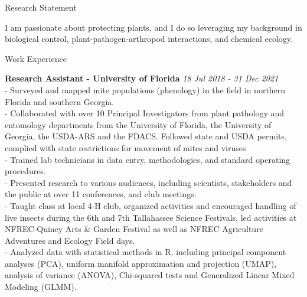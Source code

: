 \documentclass{resume} %
\begin{document}
\begin{rSection}{Research Statement}
	
I am passionate about protecting plants, and I do so leveraging my background in biological control, plant-pathogen-arthropod interactions, and chemical ecology. \end{rSection}

\begin{rSection}{Work Experience}
	
	\textbf{Research Assistant - University of Florida} \hfill {\em \textit{18 Jul 2018 - 31 Dec 2021}}\\
- Surveyed and mapped mite populations (phenology) in the field in northern Florida and southern Georgia.\\
- Collaborated with over 10 Principal Investigators from plant pathology and entomology departments from the University of Florida, the University of Georgia, the USDA-ARS and the FDACS. Followed state and USDA permits, complied with state restrictions for movement of mites and viruses\\
 - Trained lab technicians in data entry, methodologies, and standard operating procedures.\\
 - Presented research to various audiences, including scientists, stakeholders and the public at over 11 conferences, and club meetings.\\
 - Taught class at local 4-H club, organized activities and encouraged handling of live insects during the 6th and 7th Tallahassee Science Festivals, led activities at NFREC-Quincy Arts \& Garden Festival as well as NFREC Agriculture Adventures and Ecology Field days.\\
 -  Analyzed data with statistical methods in R, including principal component analyses (PCA), uniform manifold approximation and projection (UMAP), analysis of variance (ANOVA), Chi-squared tests and Generalized Linear Mixed Modeling (GLMM). \\


\end{rSection}
\end{document}
